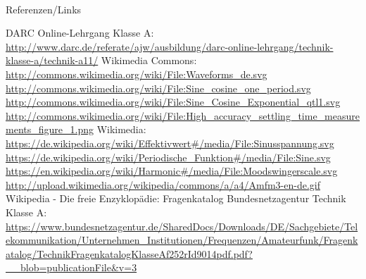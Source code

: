 \renewcommand{\refname}{Referenzen}

\hypertarget{refs}{}
\textcolor{white}{} \\ %
\Large Referenzen/Links
\footnotesize

\begin{thebibliography}{}
      DARC Online-Lehrgang Klasse A:
                    \url{http://www.darc.de/referate/ajw/ausbildung/darc-online-lehrgang/technik-klasse-a/technik-a11/}
        Wikimedia Commons: \\
                    \url{http://commons.wikimedia.org/wiki/File:Waveforms_de.svg}\\
                    \url{http://commons.wikimedia.org/wiki/File:Sine_cosine_one_period.svg}\\
                    \url{http://commons.wikimedia.org/wiki/File:Sine_Cosine_Exponential_qtl1.svg}\\
                    \url{http://commons.wikimedia.org/wiki/File:High_accuracy_settling_time_measurements_figure_1.png}
  	  Wikimedia:\\
  	  \url{https://de.wikipedia.org/wiki/Effektivwert#/media/File:Sinusspannung.svg}\\
  	  \url{https://de.wikipedia.org/wiki/Periodische_Funktion#/media/File:Sine.svg}\\
  	  \url{https://en.wikipedia.org/wiki/Harmonic#/media/File:Moodswingerscale.svg}\\
  	  \url{http://upload.wikimedia.org/wikipedia/commons/a/a4/Amfm3-en-de.gif}\\
  	    Wikipedia - Die freie Enzyklopädie:
  	   Fragenkatalog Bundesnetzagentur Technik Klasse A:\\
  	  \url{https://www.bundesnetzagentur.de/SharedDocs/Downloads/DE/Sachgebiete/Telekommunikation/Unternehmen_Institutionen/Frequenzen/Amateurfunk/Fragenkatalog/TechnikFragenkatalogKlasseAf252rId9014pdf.pdf?__blob=publicationFile&v=3}

\end{thebibliography} 


